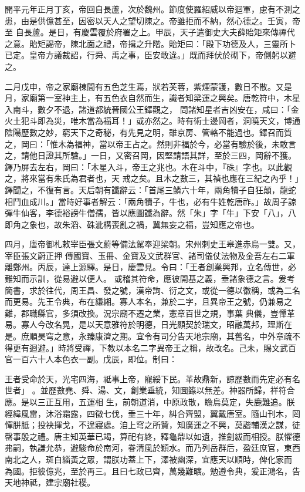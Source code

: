 
\begin{pinyinscope}

 開平元年正月丁亥，帝回自長蘆，次於魏州。節度使羅紹威以帝迴軍，慮有不測之患，由是供億甚至，因密以天人之望切陳之。帝雖拒而不納，然心德之。壬寅，帝至
 自長蘆。是日，有慶雲覆於府署之上。甲辰，天子遣御史大夫薛貽矩來傳禪代之意。貽矩謁帝，陳北面之禮，帝揖之升階。貽矩曰：「殿下功德及人，三靈所卜已定。皇帝方議裁詔，行舜、禹之事，臣安敢違。」既而拜伏於砌下，帝側躬以避之。



 二月戊申，帝之家廟棟間有五色芝生焉，狀若芙蓉，紫煙蒙護，數日不散。又是月，家廟第一室神主上，有五色衣自然而生，識者知梁運之興矣。唐乾符中，木星入南斗，數夕不退，諸道都統晉國公王鐸觀之，
 問諸知星者吉凶安在，咸曰：「金火土犯斗即為災，唯木當為福耳！」或亦然之。時有術士邊岡者，洞曉天文，博通陰陽歷數之妙，窮天下之奇秘，有先見之明，雖京房、管輅不能過也。鐸召而質之，岡曰：「惟木為福神，當以帝王占之。然則非福於今，必當有驗於後，未敢言之，請他日證其所驗。」一日，又密召岡，因堅請語其詳，至於三四，岡辭不獲。鐸乃屏去左右，岡曰：「木星入斗，帝王之兆也。木在斗中，『硃』字也。以此觀之，將來當有朱氏為君者也，天
 戒之矣。且木之數三，其禎也應在三紀之內乎！」鐸聞之，不復有言。天后朝有讖辭云：「首尾三鱗六十年，兩角犢子自狂顛，龍蛇相鬥血成川。」當時好事者解云：「兩角犢子，牛也，必有牛姓乾唐祚。」故周子諒彈牛仙客，李德裕謗牛僧孺，皆以應圖讖為辭。然「朱」字「牛」下安「八」，八即角之象也，故朱滔、硃泚構喪亂之禍，冀無妄之福，豈知應之帝也。


四月，唐帝御札敕宰臣張文蔚等備法駕奉迎梁朝。宋州刺史王皋進赤烏一雙。又，宰臣張文蔚正押
 傳國寶、玉冊、金寶及文武群官、諸司儀仗法物及金吾左右二軍離鄭州。丙辰，達上源驛。是日，慶雲見。令曰：「王者創業興邦，立名傳世，必難知而示訓，從易避以便人。
 或稽其符命，應彼開基之義，垂諸象德之言。爰考簡書，求於往代，周王昌、發之號，漢帝詢、衍之文，或從一德以徽稱，或為二名而更易。先王令典，布在縑緗。寡人本名，兼於二字，且異帝王之號，仍兼易之難，郡職縣官，多須改換。況宗廟不遷之業，憲章百世之規，事葉
 典儀，豈憚革易。寡人今改名晃，是以天意雅符於明德，日光顯契於瑞文，昭融萬邦，理斯在是。庶順昊穹之意，永臻康濟之期。宜令有司分告天地宗廟，其舊名，中外章疏不得更有迴避。」時將受禪，下教以本名二字異帝王之稱，故改名。己未，賜文武百官一百六十人本色衣一副。戊辰，即位。制曰：


王者受命於天，光宅四海，祗事上帝，寵綏下民。革故鼎新，諒歷數而先定必有名世者」
 。並歷數堯、舜、湯、文，創業垂統，知圖籙以無差。神器所歸，祥符合應。是以三正互用，五運相
 生，前朝道消，中原政散，瞻烏莫定，失鹿難追。朕經緯風雷，沐浴霜露，四徵七伐，垂三十年，糾合齊盟，翼戴唐室。隨山刊木，罔憚胼胝；投袂揮戈，不遑寢處。洎上穹之所贊，知廣運之不興，莫諧輔漢之謀，徒罄事殷之禮。唐主知英華已竭，算祀有終，釋龜鼎以如遺，推劍紱而相授。朕懼德弗嗣，執謙允恭，避駿命於南河，眷清風於穎水。而乃列岳群后，盈廷庶官，東西南北之人，斑白緇黃之眾，謂朕功蓋上下，澤被幽深，宜應天以順時，俾化家而
 為國。拒彼億兆，至於再三。且曰七政已齊，萬幾難曠。勉遵令典，爰正鴻名，告天地神祗，建宗廟社稷。




\end{pinyinscope}
